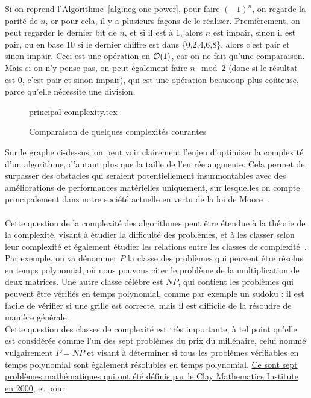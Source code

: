 Si on reprend l'Algorithme~\ref{alg:neg-one-power}, pour faire $(-1)^n$, on regarde la parité de $n$,
or pour cela, il y a plusieurs façons de le réaliser.
Premièrement, on peut regarder le dernier bit de $n$, et si il est à 1, alors $n$ est impair, sinon
il est pair, ou en base 10 si le dernier chiffre est dans \{0,2,4,6,8\}, alors c'est pair et sinon
impair.
Ceci est une opération en $\order{1}$, car on ne fait qu'une comparaison.
Mais si on n'y pense pas, on peut également faire $n \mod 2$ (donc si le résultat est 0, c'est pair
et sinon impair), qui est une opération beaucoup plus coûteuse, parce qu'elle nécessite une division.
\begin{figure}[H]
\centering
{principal-complexity.tex}
\caption{Comparaison de quelques complexités courantes}
\label{fig:complexity-comparison}
\end{figure}
Sur le graphe ci-dessus, on peut voir clairement l'enjeu d'optimiser la complexité d'un algorithme,
d'autant plus que la taille de l'entrée augmente.
Cela permet de surpasser des obstacles qui seraient potentiellement insurmontables avec des
améliorations de performances matérielles uniquement, sur lesquelles on compte principalement dans notre
société actuelle en vertu de la loi de Moore~\cite{wiki:moore}.\\ \\
Cette question de la complexité des algorithmes peut être étendue à la théorie de la complexité, visant
à étudier la difficulté des problèmes, et à les classer selon leur complexité et également étudier
les relations entre les classes de complexité~\cite{wiki:complexity-theo}.
Par exemple, on va dénommer $P$ la classe des problèmes qui peuvent être résolus en temps polynomial,
où nous pouvons citer le problème de la multiplication de deux matrices.
Une autre classe célèbre est $NP$, qui contient les problèmes qui peuvent être vérifiés en temps polynomial,
comme par exemple un sudoku : il est facile de vérifier si une grille est correcte, mais il est difficile
de la résoudre de manière générale.\\
Cette question des classes de complexité est très importante, à tel point qu'elle est considérée comme
l'un des sept problèmes du prix du millénaire, celui nommé vulgairement $P=NP$ et visant à déterminer
si tous les problèmes vérifiables en temps polynomial sont également résolubles en temps polynomial.
\href{https://www.claymath.org/millennium-problems/}{Ce sont sept problèmes mathématiques qui ont été définis par le Clay Mathematics Institute en 2000}, et pour
